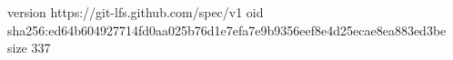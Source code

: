 version https://git-lfs.github.com/spec/v1
oid sha256:ed64b604927714fd0aa025b76d1e7efa7e9b9356eef8e4d25ecae8ea883ed3be
size 337
